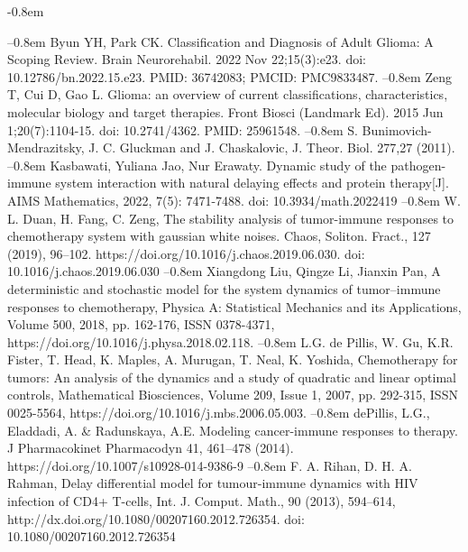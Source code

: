 \documentclass[14pt,a4paper]{extarticle}
\begin{document}
	\def\bibindent{-0.8em}
	\begin{thebibliography}{\kern\bibindent} \makeatletter \let\old@biblabel\@biblabel \def\@biblabel#1{\hspace{12.5 mm}\old@biblabel{#1}\kern\bibindent} \let\old@bibitem\bibitem \def\bibitem#1{\old@bibitem{#1}\leavevmode\kern-\bibindent} \makeatother
		
		Byun YH, Park CK. Classification and Diagnosis of Adult Glioma: A Scoping Review. Brain Neurorehabil. 2022 Nov 22;15(3):e23. doi: 10.12786/bn.2022.15.e23. PMID: 36742083; PMCID: PMC9833487.
		Zeng T, Cui D, Gao L. Glioma: an overview of current classifications, characteristics, molecular biology and target therapies. Front Biosci (Landmark Ed). 2015 Jun 1;20(7):1104-15. doi: 10.2741/4362. PMID: 25961548.
		S. Bunimovich-Mendrazitsky, J. C. Gluckman and J. Chaskalovic, J. Theor. Biol. 277,27 (2011).
		Kasbawati, Yuliana Jao, Nur Erawaty. Dynamic study of the pathogen-immune system interaction with natural delaying effects and protein therapy[J]. AIMS Mathematics, 2022, 7(5): 7471-7488. doi: 10.3934/math.2022419
		W. L. Duan, H. Fang, C. Zeng, The stability analysis of tumor-immune responses to chemotherapy system with gaussian white noises. Chaos, Soliton. Fract., 127 (2019), 96–102. https://doi.org/10.1016/j.chaos.2019.06.030. doi: 10.1016/j.chaos.2019.06.030 
		Xiangdong Liu, Qingze Li, Jianxin Pan, A deterministic and stochastic model for the system dynamics of tumor–immune responses to chemotherapy, Physica A: Statistical Mechanics and its Applications, Volume 500, 2018, pp. 162-176, ISSN 0378-4371, https://doi.org/10.1016/j.physa.2018.02.118.
		L.G. de Pillis, W. Gu, K.R. Fister, T. Head, K. Maples, A. Murugan, T. Neal, K. Yoshida, Chemotherapy for tumors: An analysis of the dynamics and a study of quadratic and linear optimal controls, Mathematical Biosciences, Volume 209, Issue 1, 2007, pp. 292-315, ISSN 0025-5564, https://doi.org/10.1016/j.mbs.2006.05.003.
		dePillis, L.G., Eladdadi, A. \& Radunskaya, A.E. Modeling cancer-immune responses to therapy. J Pharmacokinet Pharmacodyn 41, 461–478 (2014). https://doi.org/10.1007/s10928-014-9386-9
		F. A. Rihan, D. H. A. Rahman, Delay differential model for tumour-immune dynamics with HIV infection of CD4+ T-cells, Int. J. Comput. Math., 90 (2013), 594–614, http://dx.doi.org/10.1080/00207160.2012.726354. doi: 10.1080/00207160.2012.726354 

\end{thebibliography}
\end{document}
